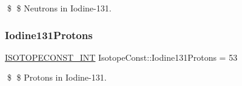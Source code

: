 \$ \$ Neutrons in Iodine-\/131. \mbox{\label{group___isotope_const-_iodine-_i131_ga919ab530e455c662f40be891b3e38ca5}} 
\subsubsection{\texorpdfstring{Iodine131\+Protons}{Iodine131Protons}}
{\footnotesize\ttfamily \mbox{\hyperlink{group___isotope_const-_macros_ga5f18360b3e99483a35c32d789e62621c}{I\+S\+O\+T\+O\+P\+E\+C\+O\+N\+S\+T\+\_\+\+I\+NT}} Isotope\+Const\+::\+Iodine131\+Protons = 53}

\$ \$ Protons in Iodine-\/131. 